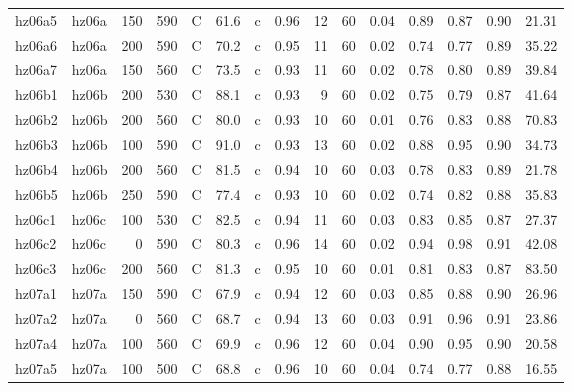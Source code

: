 \documentclass{article}
\begin{document}
\begin{landscape}
\begin{longtable}{llrrlrlrrrrrrrr}
      hz06a5 &      hz06a &  150 &  590 &     C &    61.6 &   c &  0.96 &  12 &         60 &  0.04 &  0.89 &  0.87 &  0.90 &   21.31 \\
      hz06a6 &      hz06a &  200 &  590 &     C &    70.2 &   c &  0.95 &  11 &         60 &  0.02 &  0.74 &  0.77 &  0.89 &   35.22 \\
      hz06a7 &      hz06a &  150 &  560 &     C &    73.5 &   c &  0.93 &  11 &         60 &  0.02 &  0.78 &  0.80 &  0.89 &   39.84 \\
      hz06b1 &      hz06b &  200 &  530 &     C &    88.1 &   c &  0.93 &   9 &         60 &  0.02 &  0.75 &  0.79 &  0.87 &   41.64 \\
      hz06b2 &      hz06b &  200 &  560 &     C &    80.0 &   c &  0.93 &  10 &         60 &  0.01 &  0.76 &  0.83 &  0.88 &   70.83 \\
      hz06b3 &      hz06b &  100 &  590 &     C &    91.0 &   c &  0.93 &  13 &         60 &  0.02 &  0.88 &  0.95 &  0.90 &   34.73 \\
      hz06b4 &      hz06b &  200 &  560 &     C &    81.5 &   c &  0.94 &  10 &         60 &  0.03 &  0.78 &  0.83 &  0.89 &   21.78 \\
      hz06b5 &      hz06b &  250 &  590 &     C &    77.4 &   c &  0.93 &  10 &         60 &  0.02 &  0.74 &  0.82 &  0.88 &   35.83 \\
      hz06c1 &      hz06c &  100 &  530 &     C &    82.5 &   c &  0.94 &  11 &         60 &  0.03 &  0.83 &  0.85 &  0.87 &   27.37 \\
      hz06c2 &      hz06c &    0 &  590 &     C &    80.3 &   c &  0.96 &  14 &         60 &  0.02 &  0.94 &  0.98 &  0.91 &   42.08 \\
      hz06c3 &      hz06c &  200 &  560 &     C &    81.3 &   c &  0.95 &  10 &         60 &  0.01 &  0.81 &  0.83 &  0.87 &   83.50 \\
      hz07a1 &      hz07a &  150 &  590 &     C &    67.9 &   c &  0.94 &  12 &         60 &  0.03 &  0.85 &  0.88 &  0.90 &   26.96 \\
      hz07a2 &      hz07a &    0 &  560 &     C &    68.7 &   c &  0.94 &  13 &         60 &  0.03 &  0.91 &  0.96 &  0.91 &   23.86 \\
      hz07a4 &      hz07a &  100 &  560 &     C &    69.9 &   c &  0.96 &  12 &         60 &  0.04 &  0.90 &  0.95 &  0.90 &   20.58 \\
      hz07a5 &      hz07a &  100 &  500 &     C &    68.8 &   c &  0.96 &  10 &         60 &  0.04 &  0.74 &  0.77 &  0.88 &   16.55 \\

\end{longtable}
\end{landscape}
\end{document}

